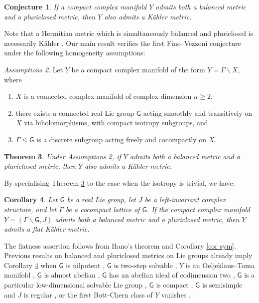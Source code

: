 \documentclass[11pt,reqno]{amsart}
\newcommand{\G}{\mathsf {G}}
\theoremstyle{plain}
\newtheorem{introtheorem}{Theorem}
\newtheorem{introconjecture}[introtheorem]{Conjecture}
\newtheorem{introcorollary}[introtheorem]{Corollary}
\theoremstyle{definition}
\theoremstyle{remark}
\newtheorem{introassumptions}[introtheorem]{Assumptions}
\begin{document}
\begin{introconjecture}
    \label{first conj}
    If a compact complex manifold $Y$ admits both a balanced metric and a pluriclosed metric, then  $Y$ also admits a K\"ahler metric.
\end{introconjecture}
Note that a Hermitian metric which is simultaneously balanced and pluriclosed is necessarily K\"ahler \cite[Remark 1]{ivanov}.
Our main result verifies the first Fino--Vezzoni conjecture under the following homogeneity assumptions:
\begin{introassumptions}
    \label{assum}
    Let $Y$ be a compact complex manifold of the form $Y = \Gamma \backslash X$, where
    \begin{enumerate}
        \item $X$ is a connected complex manifold of complex dimension $n \geq 2$,
        \item \label{assum2}there exists a connected real Lie group $\G$ acting smoothly and transitively on $X$ via biholomorphisms, with compact isotropy subgroups, and 
        \item \label{assum3}$\Gamma \leq \G$ is a discrete subgroup acting freely and cocompactly on $X$.  
    \end{enumerate}
\end{introassumptions}
\begin{introtheorem}
    \label{thm main}
    Under Assumptions \ref{assum}, if $Y$ admits both a balanced metric and a pluriclosed metric, then $Y$ also admits a K\"ahler metric.
\end{introtheorem}
By specialising Theorem \ref{thm main} to the case when the isotropy  is trivial,  we have:
\begin{introcorollary}
    \label{main cor 1}
    Let $\G$ be a real Lie group, let $J$ be a left-invariant complex structure, and let $\Gamma$ be a cocompact lattice of $\G$. If the compact complex manifold $Y = (\Gamma \backslash \G, J)$ admits both a balanced metric and a pluriclosed metric, then $Y$  admits a flat K\"ahler metric. 
\end{introcorollary}
The flatness assertion follows from Hano's theorem \cite{hano} and Corollary \ref{cor sym}.
Previous results on balanced and pluriclosed metrics on Lie groups already imply Corollary \ref{main cor 1} when
 $\G$ is nilpotent \cite{fino_2016, arroyo_2022}, 
 $\G$ is two-step solvable \cite{fusi2026, Fribert_2025}, 
 $Y$ is an Oeljeklaus--Toma manifold \cite{otiman},
 $\G$ is almost abelian \cite{Fino_2023},
 $\G$ has an abelian ideal of codimension two \cite{Zheng_2024},
 $\G$ is a particular low-dimensional solvable  Lie group \cite{fino_2025,fino_2015},
 $\G$ is compact \cite{Fribert_2025,fino_2019},
 $\G$ is semisimple and $J$ is regular \cite{kwong2026, giusti_podesta_2023, lauret},
or  the first Bott-Chern class of $Y$ vanishes
\cite{fino2026}. 
\end{document}
